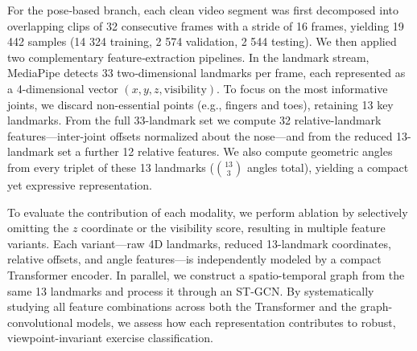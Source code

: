 \documentclass[journal,onecolumn, 11pt]{IEEEtran}
\begin{document}
For the pose‐based branch, each clean video segment was first decomposed into overlapping clips of 32 consecutive frames with a stride of 16 frames, yielding 19 442 samples (14 324 training, 2 574 validation, 2 544 testing). We then applied two complementary feature‐extraction pipelines. In the landmark stream, MediaPipe detects 33 two‐dimensional landmarks per frame, each represented as a 4-dimensional vector $(x, y, z, \text{visibility})$. To focus on the most informative joints, we discard non-essential points (e.g., fingers and toes), retaining 13 key landmarks. From the full 33-landmark set we compute 32 relative-landmark features—inter-joint offsets normalized about the nose—and from the reduced 13-landmark set a further 12 relative features. We also compute geometric angles from every triplet of these 13 landmarks ($\binom{13}{3}$ angles total), yielding a compact yet expressive representation.

To evaluate the contribution of each modality, we perform ablation by selectively omitting the $z$ coordinate or the visibility score, resulting in multiple feature variants. Each variant—raw 4D landmarks, reduced 13-landmark coordinates, relative offsets, and angle features—is independently modeled by a compact Transformer encoder. In parallel, we construct a spatio-temporal graph from the same 13 landmarks and process it through an ST-GCN. By systematically studying all feature combinations across both the Transformer and the graph-convolutional models, we assess how each representation contributes to robust, viewpoint-invariant exercise classification.
\end{document}
